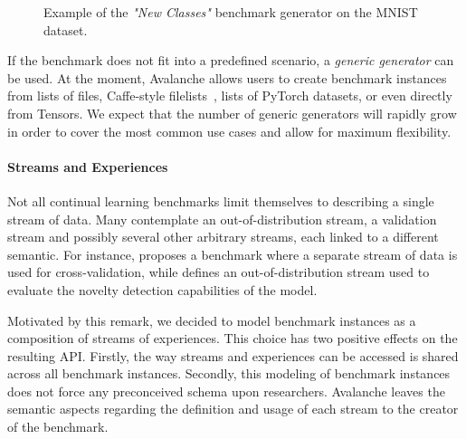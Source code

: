 \documentclass[final]{cvpr}
\theoremstyle{definition}
\begin{document}
\begin{figure}[ht]
\begin{tcolorbox}[title={Benchmarks Generators}, colback=mygray]
\inputminted{python}{nc_scenario.py}
\end{tcolorbox}
\caption{Example of the \emph{"New Classes"} benchmark generator on the MNIST dataset.}
\label{code:generators}
\end{figure}

If the benchmark does not fit into a predefined scenario, a \textit{generic generator} can be used. At the moment, Avalanche allows users to create benchmark instances from lists of files, Caffe-style filelists~\cite{jia2014caffe}, lists of PyTorch datasets, or even directly from Tensors. We expect that the number of generic generators will rapidly grow in order to cover the most common use cases and allow for maximum flexibility.

\paragraph{Streams and Experiences}

Not all continual learning benchmarks limit themselves to describing %
a single stream of data. Many %
contemplate an out-of-distribution stream, a validation stream and possibly several other arbitrary streams, each linked to a different semantic. For instance, \cite{chaudhry2019} proposes a benchmark where a separate stream of data is used for cross-validation, while %
\cite{roady2020stream} defines an out-of-distribution stream used to evaluate the novelty detection capabilities of the model.

Motivated by this remark,
we decided to model benchmark instances as a composition of streams of experiences. This choice has two positive effects on the resulting API. Firstly, the way streams and experiences can be accessed is shared across all benchmark instances. Secondly, this modeling of benchmark instances does not force any preconceived schema upon researchers. Avalanche leaves the semantic aspects regarding the definition and usage of each stream to the creator of the benchmark.
\end{document}

